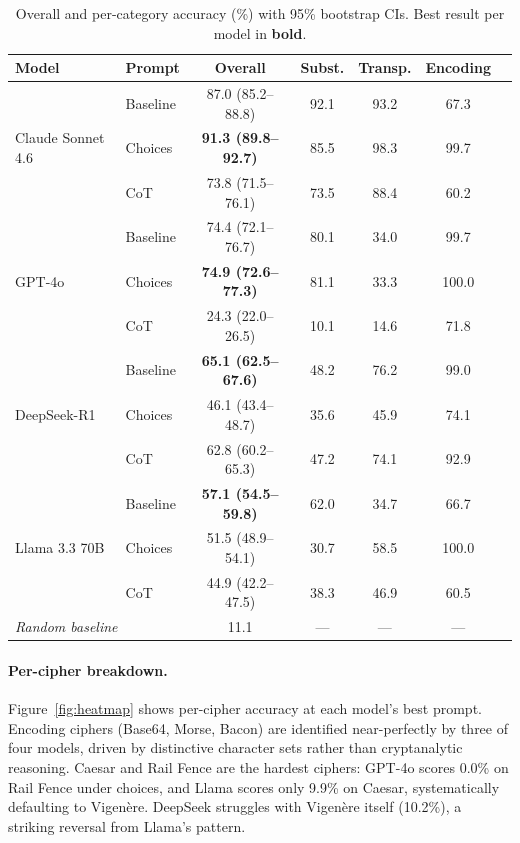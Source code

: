 \documentclass{article}
\begin{document}
\begin{table}[H]
\centering
\caption{Overall and per-category accuracy (\%) with 95\% bootstrap CIs.
Best result per model in \textbf{bold}.}
\label{tab:main}
\small
\begin{tabular}{llccccc}
\toprule
\textbf{Model} & \textbf{Prompt} & \textbf{Overall} & \textbf{Subst.} & \textbf{Transp.} & \textbf{Encoding} \\
\midrule
\multirow{3}{*}{Claude Sonnet 4.6}
  & Baseline & 87.0 {\scriptsize(85.2--88.8)} & 92.1 & 93.2 & 67.3 \\
  & Choices  & \textbf{91.3 {\scriptsize(89.8--92.7)}} & 85.5 & 98.3 & 99.7 \\
  & CoT      & 73.8 {\scriptsize(71.5--76.1)} & 73.5 & 88.4 & 60.2 \\
\midrule
\multirow{3}{*}{GPT-4o}
  & Baseline & 74.4 {\scriptsize(72.1--76.7)} & 80.1 & 34.0 & 99.7 \\
  & Choices  & \textbf{74.9 {\scriptsize(72.6--77.3)}} & 81.1 & 33.3 & 100.0 \\
  & CoT      & 24.3 {\scriptsize(22.0--26.5)} & 10.1 & 14.6 & 71.8 \\
\midrule
\multirow{3}{*}{DeepSeek-R1}
  & Baseline & \textbf{65.1 {\scriptsize(62.5--67.6)}} & 48.2 & 76.2 & 99.0 \\
  & Choices  & 46.1 {\scriptsize(43.4--48.7)} & 35.6 & 45.9 & 74.1 \\
  & CoT      & 62.8 {\scriptsize(60.2--65.3)} & 47.2 & 74.1 & 92.9 \\
\midrule
\multirow{3}{*}{Llama 3.3 70B}
  & Baseline & \textbf{57.1 {\scriptsize(54.5--59.8)}} & 62.0 & 34.7 & 66.7 \\
  & Choices  & 51.5 {\scriptsize(48.9--54.1)} & 30.7 & 58.5 & 100.0 \\
  & CoT      & 44.9 {\scriptsize(42.2--47.5)} & 38.3 & 46.9 & 60.5 \\
\midrule
\multicolumn{2}{l}{\textit{Random baseline}} & 11.1 & --- & --- & --- \\
\bottomrule
\end{tabular}
\end{table}

\paragraph{Per-cipher breakdown.}
Figure~\ref{fig:heatmap} shows per-cipher accuracy at each model's best prompt.
Encoding ciphers (Base64, Morse, Bacon) are identified near-perfectly by three of
four models, driven by distinctive character sets rather than cryptanalytic reasoning.
Caesar and Rail Fence are the hardest ciphers: GPT-4o scores 0.0\% on Rail Fence
under choices, and Llama scores only 9.9\% on Caesar, systematically defaulting
to Vigen\`{e}re. DeepSeek struggles with Vigen\`{e}re itself (10.2\%), a striking
reversal from Llama's pattern.
\end{document}
